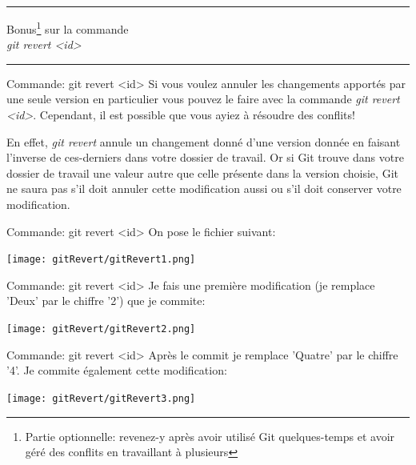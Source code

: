 \documentclass{beamer}
\begin{document}

\begin{frame}
\huge
\begin{center}
\hrule
\bigskip
Bonus\footnote[frame]{Partie optionnelle: revenez-y après avoir utilisé Git quelques-temps et avoir géré des conflits en travaillant à plusieurs} sur la commande\\ \textit{git revert <id>}
\bigskip
\hrule
\end{center}
\normalsize
\end{frame}

\begin{frame}{Commande: git revert <id>}
Si vous voulez annuler les changements apportés par une seule version en particulier vous pouvez le faire avec la commande \textit{git revert <id>}. Cependant, il est possible que vous ayiez à résoudre des conflits!\\
\medskip

En effet, \textit{git revert} annule un changement donné d'une version donnée en faisant l'inverse de ces-derniers dans votre dossier de travail. Or si Git trouve dans votre dossier de travail une valeur autre que celle présente dans la version choisie, Git ne saura pas s'il doit annuler cette modification aussi ou s'il doit conserver votre modification.
\end{frame}

\begin{frame}{Commande: git revert <id>}
On pose le fichier suivant:
\begin{center}
	\texttt{[image: gitRevert/gitRevert1.png]}
\end{center}
\end{frame}

\begin{frame}{Commande: git revert <id>}
Je fais une première modification (je remplace 'Deux' par le chiffre '2') que je commite:
\begin{center}
	\texttt{[image: gitRevert/gitRevert2.png]}
\end{center}
\end{frame}

\begin{frame}{Commande: git revert <id>}
Après le commit je remplace 'Quatre' par le chiffre '4'. Je commite également cette modification:
\begin{center}
	\texttt{[image: gitRevert/gitRevert3.png]}
\end{center}
\end{frame}
\end{document}

